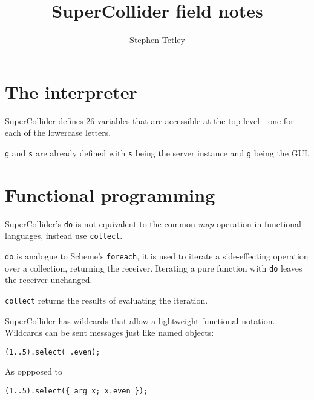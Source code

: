 \documentclass{article}
\begin{document}
\author{Stephen Tetley}
\title{SuperCollider field notes}
\maketitle




\section{The interpreter}


SuperCollider defines 26 variables that are accessible at the 
top-level - one for each of the lowercase letters. 

\texttt{g} and \texttt{s} are already defined with \texttt{s} 
being the server instance and \texttt{g} being the GUI.

\section{Functional programming}

SuperCollider's \texttt{do} is not equivalent to the common 
\emph{map} operation in functional languages, instead use 
\texttt{collect}.

\texttt{do} is analogue to Scheme's \texttt{foreach}, it is used 
to iterate a side-effecting operation over a collection, returning
the receiver. Iterating a pure function with \texttt{do} leaves 
the receiver unchanged. 

\texttt{collect} returns the results of evaluating the iteration.

SuperCollider has wildcards that allow a lightweight functional 
notation. Wildcards can be sent messages just like named objects:

\begin{verbatim}
(1..5).select(_.even);
\end{verbatim}

As oppposed to
\begin{verbatim}
(1..5).select({ arg x; x.even });
\end{verbatim}
\end{document}

